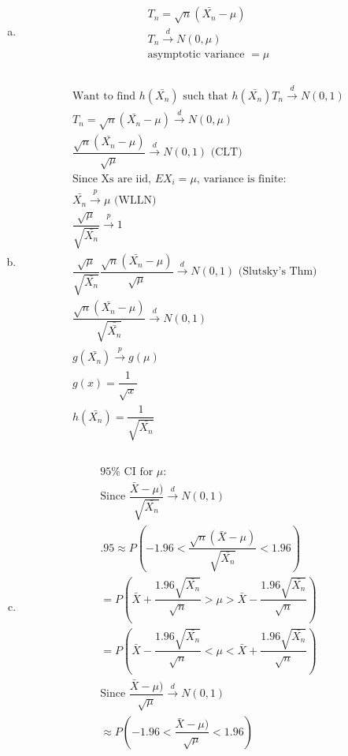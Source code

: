 \documentclass{article}
\begin{document}
\begin{flushleft}
\begin{enumerate}[(a)]
	\item 
\begin{multline*}\\
T_n=\sqrt{n}(\bar{X_n}-\mu)\\
T_n\overset{d}{\to}N(0,\mu)\\
\text{asymptotic variance } =\mu\\
\end{multline*}

	\item 
\begin{multline*}\\
\text{Want to find } h(\bar{X_n}) \text{ such that } h(\bar{X_n}) T_n \overset{d}{\to} N(0,1)\\
T_n=\sqrt{n}(\bar{X_n}-\mu)\overset{d}{\to} N(0,\mu)\\
\dfrac{\sqrt{n}(\bar{X_n}-\mu)}{\sqrt{\mu}}\overset{d}{\to}N(0,1) \text{ (CLT)}\\
\text{Since Xs are iid, } EX_i=\mu \text{, variance is finite:}\\
\bar{X_n}\overset{p}{\to} \mu \text{ (WLLN)}\\
\dfrac{\sqrt{\mu}}{\sqrt{\bar{X_n}}}\overset{p}{\to}1\\
\dfrac{\sqrt{\mu}}{\sqrt{\bar{X_n}}}\dfrac{\sqrt{n}(\bar{X_n}-\mu)}{\sqrt{\mu}}\overset{d}{\to}N(0,1) \text{ (Slutsky's Thm)}\\
\dfrac{\sqrt{n}(\bar{X_n}-\mu)}{\sqrt{\bar{\bar{X_n}}}}\overset{d}{\to}N(0,1)\\
g(\bar{X_n})\overset{p}{\to}g(\mu)\\
g(x)=\dfrac{1}{\sqrt{x}}\\
h(\bar{X_n})=\dfrac{1}{\sqrt{\bar{X_n}}}\\
\end{multline*}

	\item 
\begin{multline*}\\
95\% \text{ CI for } \mu:\\
\text{Since }\dfrac{\bar{X}-\mu)}{\sqrt{\bar{X_n}}}\overset{d}{\to}N(0,1)\\
.95\approx P\left(-1.96 <\dfrac{\sqrt{n}(\bar{X}-\mu)}{\sqrt{\bar{X_n}}}<1.96\right)\\
=P\left(\bar{X}+\dfrac{1.96\sqrt{\bar{X_n}}}{\sqrt{n}}>\mu>\bar{X}-\dfrac{1.96\sqrt{\bar{X_n}}}{\sqrt{n}} \right)\\
=P\left(\bar{X}-\dfrac{1.96\sqrt{\bar{X_n}}}{\sqrt{n}}<\mu<\bar{X}+\dfrac{1.96\sqrt{\bar{X_n}}}{\sqrt{n}} \right)\\
\text{Since }\dfrac{\bar{X}-\mu)}{\sqrt{\mu}}\overset{d}{\to}N(0,1)\\
\approx P\left(-1.96<\dfrac{\bar{X}-\mu)}{\sqrt{\mu}}<1.96\right)\\
\end{multline*}


\end{enumerate}
\end{flushleft}
\end{document}
